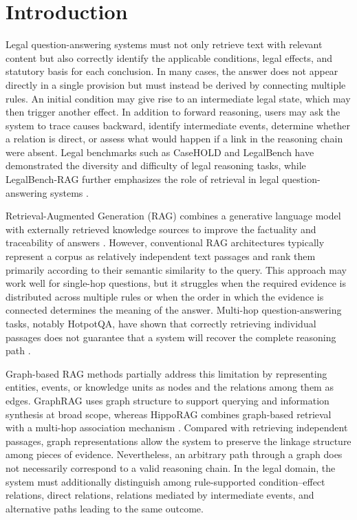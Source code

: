 \section{Introduction}
\label{sec:introduction}

Legal question-answering systems must not only retrieve text with relevant
content but also correctly identify the applicable conditions, legal
effects, and statutory basis for each conclusion. In many cases, the answer
does not appear directly in a single provision but must instead be derived
by connecting multiple rules. An initial condition may give rise to an
intermediate legal state, which may then trigger another effect. In addition
to forward reasoning, users may ask the system to trace causes backward,
identify intermediate events, determine whether a relation is direct, or
assess what would happen if a link in the reasoning chain were absent. Legal
benchmarks such as CaseHOLD and LegalBench have demonstrated the diversity
and difficulty of legal reasoning tasks, while LegalBench-RAG further
emphasizes the role of retrieval in legal question-answering systems
\cite{zheng2021casehold,guha2023legalbench,alami2024legalbenchrags}.

Retrieval-Augmented Generation (RAG) combines a generative language model
with externally retrieved knowledge sources to improve the factuality and
traceability of answers \cite{lewis2020rag}. However, conventional RAG
architectures typically represent a corpus as relatively independent text
passages and rank them primarily according to their semantic similarity to
the query. This approach may work well for single-hop questions, but it
struggles when the required evidence is distributed across multiple rules
or when the order in which the evidence is connected determines the meaning
of the answer. Multi-hop question-answering tasks, notably HotpotQA, have
shown that correctly retrieving individual passages does not guarantee that
a system will recover the complete reasoning path \cite{yang2018hotpotqa}.

Graph-based RAG methods partially address this limitation by representing
entities, events, or knowledge units as nodes and the relations among them
as edges. GraphRAG uses graph structure to support querying and information
synthesis at broad scope, whereas HippoRAG combines graph-based retrieval
with a multi-hop association mechanism
\cite{edge2024graphrag,gutierrez2024hipporag}. Compared with retrieving
independent passages, graph representations allow the system to preserve
the linkage structure among pieces of evidence. Nevertheless, an arbitrary
path through a graph does not necessarily correspond to a valid reasoning
chain. In the legal domain, the system must additionally distinguish among
rule-supported condition--effect relations, direct relations, relations
mediated by intermediate events, and alternative paths leading to the same
outcome.


